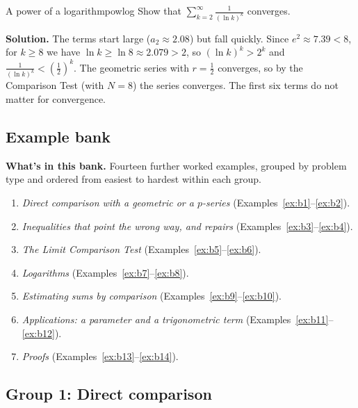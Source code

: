 \documentclass[11pt]{article}
\begin{document}
\begin{exmp}{A power of a logarithm}{powlog}
Show that $\displaystyle\sum_{k=2}^\infty\frac1{(\ln k)^k}$ converges.

\textbf{Solution.} The terms start large ($a_2\approx2.08$) but fall quickly. Since $e^2\approx7.39<8$, for $k\ge8$ we have $\ln k\ge\ln8\approx2.079>2$, so $(\ln k)^k>2^k$ and $\frac1{(\ln k)^k}<\left(\frac12\right)^k$. The geometric series with $r=\frac12$ converges, so by the Comparison Test (with $N=8$) the series converges. The first six terms do not matter for convergence.
\end{exmp}

\subsection*{Example bank}

\textbf{What's in this bank.} Fourteen further worked examples, grouped by problem type and ordered from easiest to hardest within each group.
\begin{enumerate}[nosep]
  \item \emph{Direct comparison with a geometric or a $p$-series} (Examples~\ref{ex:b1}--\ref{ex:b2}).
  \item \emph{Inequalities that point the wrong way, and repairs} (Examples~\ref{ex:b3}--\ref{ex:b4}).
  \item \emph{The Limit Comparison Test} (Examples~\ref{ex:b5}--\ref{ex:b6}).
  \item \emph{Logarithms} (Examples~\ref{ex:b7}--\ref{ex:b8}).
  \item \emph{Estimating sums by comparison} (Examples~\ref{ex:b9}--\ref{ex:b10}).
  \item \emph{Applications: a parameter and a trigonometric term} (Examples~\ref{ex:b11}--\ref{ex:b12}).
  \item \emph{Proofs} (Examples~\ref{ex:b13}--\ref{ex:b14}).
\end{enumerate}

\subsection*{Group 1: Direct comparison}
\end{document}
